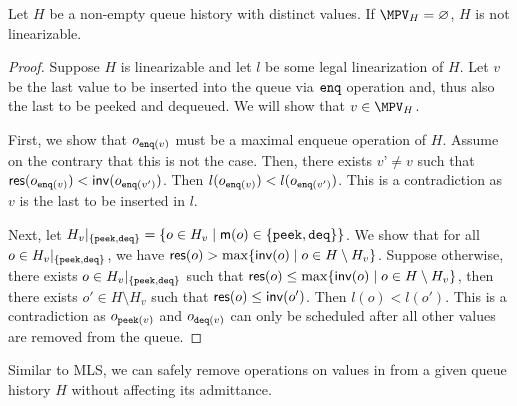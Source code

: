 \begin{lemma}\label{mpv-empty}
    Let $H$ be a non-empty queue history with distinct values. If $\MPV_H = \varnothing$, $H$ is not linearizable.
\end{lemma}
\begin{proof}
    Suppose $H$ is linearizable and let $l$ be some legal linearization of $H$. Let $v$ be the last value to be inserted into the queue via ${\tt enq}$ operation and, thus also the last to be peeked and dequeued. We will show that $v \in \MPV_H$.
    
    First, we show that $o_{{\tt enq}(v)}$ must be a maximal enqueue operation of $H$. Assume on the contrary that this is not the case. Then, there exists $v’ \neq v$ such that ${\sf res}(o_{{\tt enq}(v)}) < {\sf inv}(o_{{\tt enq}(v')})$. Then $l(o_{{\tt enq}(v)}) < l(o_{{\tt enq}(v')})$. This is a contradiction as $v$ is the last to be inserted in $l$.
    
    Next, let $H_v|_{\{{\tt peek}, {\tt deq}\}} = \{o \in H_v \;|\; {\sf m}(o) \in \{{\tt peek}, {\tt deq}\}\}$. We show that for all $o \in H_v|_{\{{\tt peek}, {\tt deq}\}}$, we have ${\sf res}(o) > \max\{{\sf inv}(o) \;|\; o \in H\setminus H_v\}$. Suppose otherwise, there exists $o \in H_v|_{\{{\tt peek}, {\tt deq}\}}$ such that ${\sf res}(o) \leq \max\{{\sf inv}(o) \;|\; o \in H\setminus H_v\}$, then there exists $o' \in H\setminus H_v$ such that ${\sf res}(o) \leq {\sf inv}(o')$. Then $l(o) < l(o')$. This is a contradiction as $o_{{\tt peek}(v)}$ and $o_{{\tt deq}(v)}$ can only be scheduled after all other values are removed from the queue.
\end{proof}

Similar to MLS, we can safely remove operations on values in \MPV from a given queue history $H$ without affecting its admittance.

